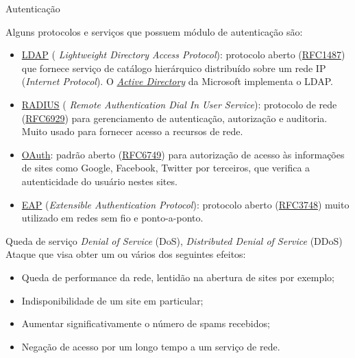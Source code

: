 
\begin{frame}{Autenticação}\small
  
  Alguns protocolos e serviços que possuem módulo de autenticação são:

  \begin{itemize}[<+->]
  \item \href{https://pt.wikipedia.org/wiki/LDAP}{LDAP} ({\em
      Lightweight Directory Access Protocol}): protocolo aberto
    (\href{http://goo.gl/IX8UPi}{RFC1487}) que fornece serviço de
    catálogo hierárquico distribuído sobre um rede IP ({\em Internet
      Protocol}). O
    \href{https://pt.wikipedia.org/wiki/Active_Directory}{\em Active
      Directory} da Microsoft implementa o LDAP.
  \item \href{https://pt.wikipedia.org/wiki/RADIUS}{RADIUS} ({\em
      Remote Authentication Dial In User Service}): protocolo de rede
    (\href{https://tools.ietf.org/html/rfc6929}{RFC6929}) para
    gerenciamento de autenticação, autorização e auditoria. Muito
    usado para fornecer acesso a recursos de rede.
  \item \href{https://en.wikipedia.org/wiki/OAuth}{OAuth}: padrão
    aberto (\href{https://tools.ietf.org/html/rfc6749}{RFC6749}) para
    autorização de acesso às informações de sites como Google,
    Facebook, Twitter por terceiros, que verifica a autenticidade do
    usuário nestes sites.
  \item
    \href{https://pt.wikipedia.org/wiki/Extensible_Authentication_Protocol}{EAP}
    ({\em Extensible Authentication Protocol}): protocolo aberto
    (\href{https://tools.ietf.org/html/rfc3748}{RFC3748}) muito
    utilizado em redes sem fio e ponto-a-ponto.
  \end{itemize}
  \end{frame}


  \begin{frame}{Queda de serviço}
    {\em  Denial of Service} (DoS), {\em Distributed Denial of Service} (DDoS)\\
    Ataque que visa obter um ou vários dos seguintes efeitos:
    \begin{itemize}[<+->]
    \item Queda de performance da rede, lentidão na abertura de sites por exemplo;
    \item Indisponibilidade de um site em particular;
    \item Aumentar significativamente o número de spams recebidos;
    \item Negação de acesso por um longo tempo a um serviço de rede.
    \end{itemize}
  \end{frame}

